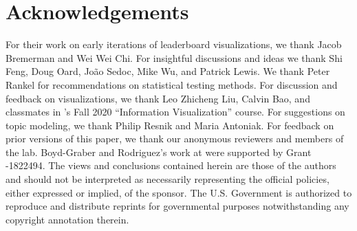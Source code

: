 \section*{Acknowledgements}

For their work on early iterations of leaderboard visualizations, we thank Jacob Bremerman and Wei Wei Chi.
For insightful discussions and ideas we thank Shi Feng, Doug Oard, João Sedoc, Mike Wu, and Patrick Lewis.
We thank Peter Rankel for recommendations on statistical testing methods.
For discussion and feedback on visualizations, we thank Leo Zhicheng Liu, Calvin Bao, and classmates in 's Fall 2020 ``Information Visualization'' course.
For suggestions on topic modeling, we thank Philip Resnik and Maria Antoniak.
For feedback on prior versions of this paper, we thank our anonymous  reviewers and members of the   lab.
Boyd-Graber and Rodriguez's work at  were supported by  Grant -1822494.
%
The views and conclusions contained herein are those of the authors and should not be interpreted as necessarily representing the official policies, either expressed or implied, of the sponsor.
%
The U.S. Government is authorized to reproduce and distribute reprints for governmental purposes notwithstanding any copyright annotation therein.
